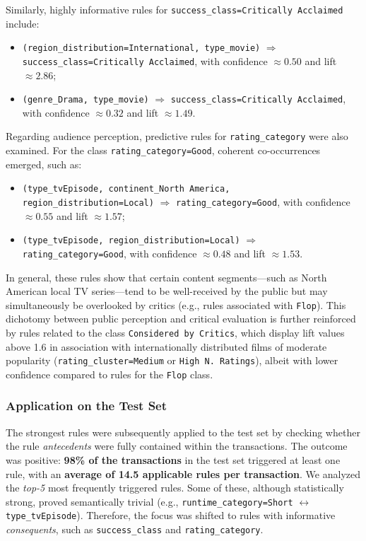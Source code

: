 \documentclass[10pt]{article}
\begin{document}
Similarly, highly informative rules for \texttt{success\_class=Critically Acclaimed} include:
\begin{itemize}
    \item \texttt{(region\_distribution=International, type\_movie)} $\Rightarrow$ \texttt{success\_class=Critically Acclaimed}, with confidence $\approx 0.50$ and lift $\approx 2.86$;
    \item \texttt{(genre\_Drama, type\_movie)} $\Rightarrow$ \texttt{success\_class=Critically Acclaimed}, with confidence $\approx 0.32$ and lift $\approx 1.49$.
\end{itemize}

Regarding audience perception, predictive rules for \texttt{rating\_category} were also examined. For the class \texttt{rating\_category=Good}, coherent co-occurrences emerged, such as:
\begin{itemize}
    \item \texttt{(type\_tvEpisode, continent\_North America, region\_distribution=Local)} $\Rightarrow$ \texttt{rating\_category=Good}, with confidence $\approx 0.55$ and lift $\approx 1.57$;
    \item \texttt{(type\_tvEpisode, region\_distribution=Local)} $\Rightarrow$ \texttt{rating\_category=Good}, with confidence $\approx 0.48$ and lift $\approx 1.53$.
\end{itemize}

In general, these rules show that certain content segments—such as North American local TV series—tend to be well-received by the public but may simultaneously be overlooked by critics (e.g., rules associated with \texttt{Flop}).
This dichotomy between public perception and critical evaluation is further reinforced by rules related to the class \texttt{Considered by Critics}, which display lift values above 1.6 in association with internationally distributed films of moderate popularity (\texttt{rating\_cluster=Medium} or \texttt{High N. Ratings}), albeit with lower confidence compared to rules for the \texttt{Flop} class.


\subsubsection{Application on the Test Set}

The strongest rules were subsequently applied to the test set by checking whether the rule \textit{antecedents} were fully contained within the transactions. The outcome was positive: \textbf{98\% of the transactions} in the test set triggered at least one rule, with an \textbf{average of 14.5 applicable rules per transaction}.
We analyzed the \textit{top-5} most frequently triggered rules. Some of these, although statistically strong, proved semantically trivial (e.g., \texttt{runtime\_category=Short} $\leftrightarrow$ \texttt{type\_tvEpisode}). Therefore, the focus was shifted to rules with informative \textit{consequents}, such as \texttt{success\_class} and \texttt{rating\_category}.
\end{document}
